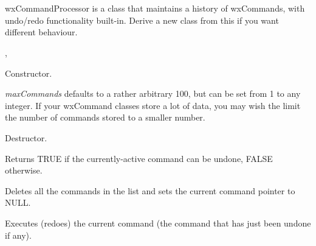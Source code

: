 \section{}\label{wxcommandprocessor}

wxCommandProcessor is a class that maintains a history of wxCommands,
with undo/redo functionality built-in. Derive a new class from this
if you want different behaviour.




, 




Constructor.

{\it maxCommands} defaults to a rather arbitrary 100, but can be set from 1 to any integer.
If your wxCommand classes store a lot of data, you may wish the limit the number of
commands stored to a smaller number.



Destructor.



Returns TRUE if the currently-active command can be undone, FALSE otherwise.



Deletes all the commands in the list and sets the current command pointer to NULL.



Executes (redoes) the current command (the command that has just been undone if any).



